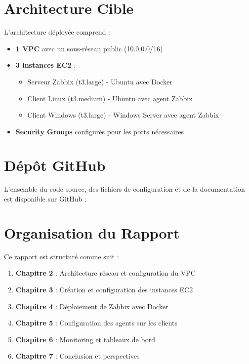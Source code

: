 \section{Architecture Cible}

L'architecture déployée comprend :

\begin{itemize}
    \item \textbf{1 VPC} avec un sous-réseau public (10.0.0.0/16)
    \item \textbf{3 instances EC2} :
    \begin{itemize}
        \item Serveur Zabbix (t3.large) - Ubuntu avec Docker
        \item Client Linux (t3.medium) - Ubuntu avec agent Zabbix
        \item Client Windows (t3.large) - Windows Server avec agent Zabbix
    \end{itemize}
    \item \textbf{Security Groups} configurés pour les ports nécessaires
\end{itemize}

\section{Dépôt GitHub}

L'ensemble du code source, des fichiers de configuration et de la documentation est disponible sur GitHub :

\begin{center}
\end{center}

\section{Organisation du Rapport}

Ce rapport est structuré comme suit :

\begin{enumerate}
    \item \textbf{Chapitre 2} : Architecture réseau et configuration du VPC
    \item \textbf{Chapitre 3} : Création et configuration des instances EC2
    \item \textbf{Chapitre 4} : Déploiement de Zabbix avec Docker
    \item \textbf{Chapitre 5} : Configuration des agents sur les clients
    \item \textbf{Chapitre 6} : Monitoring et tableaux de bord
    \item \textbf{Chapitre 7} : Conclusion et perspectives
\end{enumerate}
